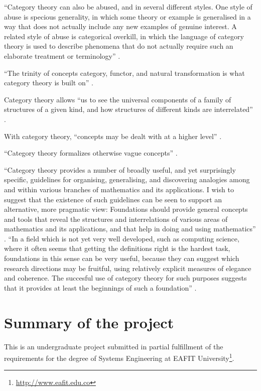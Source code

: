 ``Category theory can also be abused, and in several different styles.
One style of abuse is specious generality, in which some theory or
example is generalised in a way that does not actually include any new
examples of genuine interest. A related style of abuse is categorical
overkill, in which the language of category theory is used to describe
phenomena that do not actually require such an elaborate treatment or
terminology'' \parencite[50]{goguen-1991}.

``The trinity of concepts category, functor, and natural
transformation is what category theory is built on''
\parencite{nlab-category-theory}.

Category theory allows ``us to see the universal components of a
family of structures of a given kind, and how structures of different
kinds are interrelated'' \parencite[1]{marquis-2013}.

With category theory, ``concepts may be dealt with at a higher level''
\parencite[xi]{pierce-1991}.

``Category theory formalizes otherwise vague concepts''
\parencite[414]{poigne-1992}.

``Category theory provides a number of broadly useful, and yet
surprisingly specific, guidelines for organising, generalising, and
discovering analogies among and within various branches of mathematics
and its applications. I wish to suggest that the existence of such
guidelines can be seen to support an alternative, more pragmatic view:
Foundations should provide general concepts and tools that reveal the
structures and interrelations of various areas of mathematics and its
applications, and that help in doing and using mathematics''
\parencite[64]{goguen-1991}. ``In a field which is not yet very well
developed, such as computing science, where it often seems that
getting the definitions right is the hardest task, foundations in this
sense can be very useful, because they can suggest which research
directions may be fruitful, using relatively explicit measures of
elegance and coherence. The succesful use of category theory for such
purposes suggests that it provides at least the beginnings of such a
foundation'' \parencite[64]{goguen-1991}.

\section*{Summary of the project}
\label{sec:introduction-summary}

This is an undergraduate project submitted in partial fulfillment of
the requirements for the degree of Systems Engineering at EAFIT
University\footnote{\url{http://www.eafit.edu.co}}.


